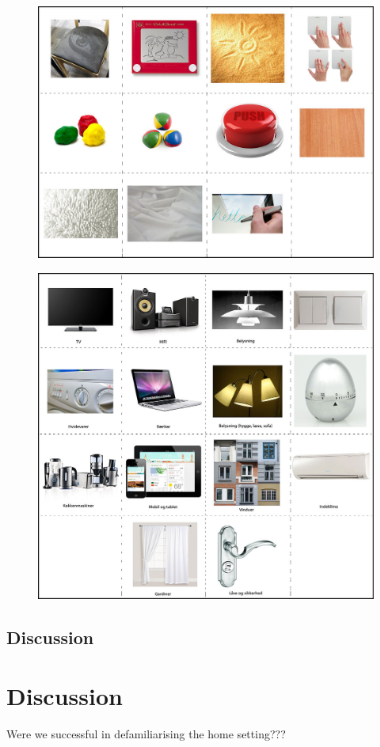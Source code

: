 \begin{figure}
\centering
\begin{minipage}[t]{.5\textwidth}
  \centering
  \includegraphics[width=0.9\linewidth]{workshops/technology-cards}
  \label{ch:workshops:technology-cards}
\end{minipage}%
\begin{minipage}[t]{.5\textwidth}
  \centering
  \includegraphics[width=0.9\linewidth]{workshops/appliance-cards}
  \label{ch:workshops:appliance-cards}
\end{minipage}
\end{figure}

\subsection{Discussion}
\label{ch:workshops:workshop-ii:discussion}

\section{Discussion}
\label{ch:workshops:discussion}

 Were we successful in defamiliarising the home setting???

